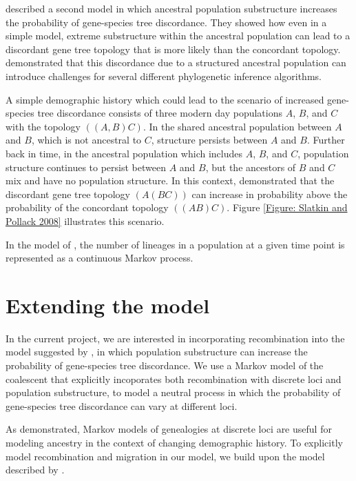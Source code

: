 \documentclass[11pt,oneside]{amsart}
\begin{document}
\cite{SlatkinPollack2008} described a second model in which ancestral population substructure increases the probability of gene-species tree discordance. They showed how even in a simple model, extreme substructure within the ancestral population can lead to a discordant gene tree topology that is more likely than the concordant topology. \cite{DeGiorgioRosenberg2016} demonstrated that this discordance due to a structured ancestral population can introduce challenges for several different phylogenetic inference algorithms.

A simple demographic history which could lead to the scenario of increased gene-species tree discordance consists of three modern day populations $A$, $B$, and $C$ with the topology $((A, B)C)$. In the shared ancestral population between $A$ and $B$, which is not ancestral to $C$, structure persists between $A$ and $B$. Further back in time, in the ancestral population which includes $A$, $B$, and $C$, population structure continues to persist between $A$ and $B$, but the ancestors of  $B$ and $C$ mix and have no population structure. In this context, \cite{SlatkinPollack2008} demonstrated that the discordant gene tree topology $(A(BC))$ can increase in probability above the probability of the concordant topology $((AB)C)$. Figure \ref{Figure: Slatkin and Pollack 2008} illustrates this scenario.


In the model of \cite{SlatkinPollack2008}, the number of lineages in a population at a given time point is represented as a continuous Markov process.

\section{Extending the model}
\label{Section: Extending the model}

In the current project, we are interested in incorporating recombination into the model suggested by \cite{SlatkinPollack2008}, in which population substructure can increase the probability of gene-species tree discordance. We use a Markov model of the coalescent that explicitly incoporates both recombination with discrete loci and population substructure, to model a neutral process in which the probability of gene-species tree discordance can vary at different loci.

As \cite{SlatkinPollack2006} demonstrated, Markov models of genealogies at discrete loci are useful for modeling ancestry in the context of changing demographic history. To explicitly model recombination and migration in our model, we build upon the model described by \cite{SimonsenChurchill1997}. 
\end{document}
